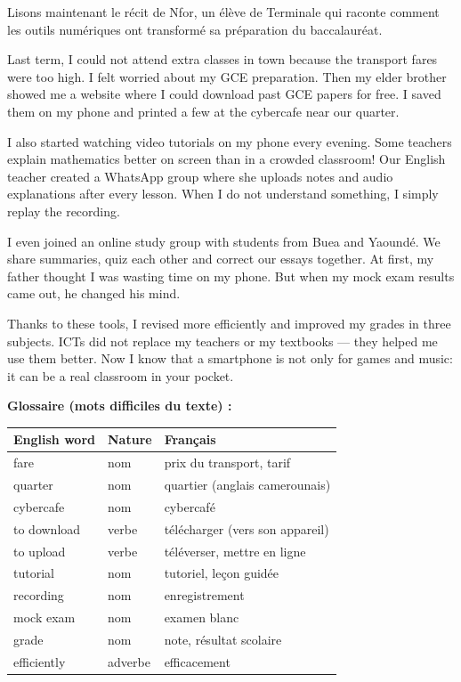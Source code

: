 \documentclass[11pt]{article}
\begin{document}
Lisons maintenant le récit de Nfor, un élève de Terminale qui raconte comment les outils numériques ont transformé sa préparation du baccalauréat.

\begin{textebox}
Last term, I could not attend extra classes in town because the transport fares were too high. I felt worried about my GCE preparation. Then my elder brother showed me a website where I could download past GCE papers for free. I saved them on my phone and printed a few at the cybercafe near our quarter.

I also started watching video tutorials on my phone every evening. Some teachers explain mathematics better on screen than in a crowded classroom! Our English teacher created a WhatsApp group where she uploads notes and audio explanations after every lesson. When I do not understand something, I simply replay the recording.

I even joined an online study group with students from Buea and Yaoundé. We share summaries, quiz each other and correct our essays together. At first, my father thought I was wasting time on my phone. But when my mock exam results came out, he changed his mind.

Thanks to these tools, I revised more efficiently and improved my grades in three subjects. ICTs did not replace my teachers or my textbooks — they helped me use them better. Now I know that a smartphone is not only for games and music: it can be a real classroom in your pocket.
\end{textebox}

\textbf{Glossaire (mots difficiles du texte) :}

\begin{center}
\begin{tabularx}{\linewidth}{|l|l|X|}
\hline
\rowcolor{popblueL} English word & Nature & Français \\
\hline
fare & nom & prix du transport, tarif \\
\hline
quarter & nom & quartier (anglais camerounais) \\
\hline
cybercafe & nom & cybercafé \\
\hline
to download & verbe & télécharger (vers son appareil) \\
\hline
to upload & verbe & téléverser, mettre en ligne \\
\hline
tutorial & nom & tutoriel, leçon guidée \\
\hline
recording & nom & enregistrement \\
\hline
mock exam & nom & examen blanc \\
\hline
grade & nom & note, résultat scolaire \\
\hline
efficiently & adverbe & efficacement \\
\hline
\end{tabularx}
\end{center}
\end{document}
